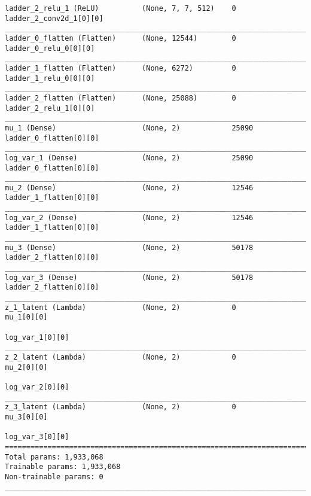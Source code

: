 \begin{lstlisting}[caption={\textsc{Mnist}-\ac{VLAE}-\ac{GAN} Encoder},captionpos=b,basicstyle=\tiny, label={lst:mnist-vlae-gan-encoder}]
ladder_2_relu_1 (ReLU)          (None, 7, 7, 512)    0           ladder_2_conv2d_1[0][0]
__________________________________________________________________________________________________
ladder_0_flatten (Flatten)      (None, 12544)        0           ladder_0_relu_0[0][0]
__________________________________________________________________________________________________
ladder_1_flatten (Flatten)      (None, 6272)         0           ladder_1_relu_0[0][0]
__________________________________________________________________________________________________
ladder_2_flatten (Flatten)      (None, 25088)        0           ladder_2_relu_1[0][0]
__________________________________________________________________________________________________
mu_1 (Dense)                    (None, 2)            25090       ladder_0_flatten[0][0]
__________________________________________________________________________________________________
log_var_1 (Dense)               (None, 2)            25090       ladder_0_flatten[0][0]
__________________________________________________________________________________________________
mu_2 (Dense)                    (None, 2)            12546       ladder_1_flatten[0][0]
__________________________________________________________________________________________________
log_var_2 (Dense)               (None, 2)            12546       ladder_1_flatten[0][0]
__________________________________________________________________________________________________
mu_3 (Dense)                    (None, 2)            50178       ladder_2_flatten[0][0]
__________________________________________________________________________________________________
log_var_3 (Dense)               (None, 2)            50178       ladder_2_flatten[0][0]
__________________________________________________________________________________________________
z_1_latent (Lambda)             (None, 2)            0           mu_1[0][0]
                                                                 log_var_1[0][0]
__________________________________________________________________________________________________
z_2_latent (Lambda)             (None, 2)            0           mu_2[0][0]
                                                                 log_var_2[0][0]
__________________________________________________________________________________________________
z_3_latent (Lambda)             (None, 2)            0           mu_3[0][0]
                                                                 log_var_3[0][0]
==================================================================================================
Total params: 1,933,068
Trainable params: 1,933,068
Non-trainable params: 0
__________________________________________________________________________________________________
\end{lstlisting}